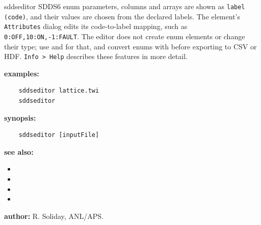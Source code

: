 \begin{sddsprog}{sddseditor}
  SDDS6 enum parameters, columns and arrays are shown as \verb|label (code)|, and
  their values are chosen from the declared labels. The element's \verb|Attributes|
  dialog edits its code-to-label mapping, such as \verb|0:OFF,10:ON,-1:FAULT|. The
  editor does not create enum elements or change their type; use
   and  for that, and convert enums with
   before exporting to CSV or HDF. \verb|Info > Help| describes
  these features in more detail.

  \item \textbf{examples:}
    \begin{verbatim}
    sddseditor lattice.twi
    sddseditor
    \end{verbatim}

  \item \textbf{synopsis:}
    \begin{verbatim}
    sddseditor [inputFile]
    \end{verbatim}

  \item \textbf{see also:}
    \begin{itemize}
      \item {}
      \item {}
      \item {}
      \item {}
    \end{itemize}
  \item \textbf{author:} R. Soliday, ANL/APS.
\end{sddsprog}
